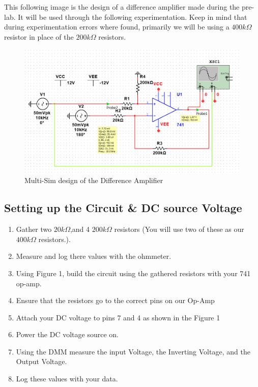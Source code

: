 \documentclass[12pt]{article}
\begin{document}
This following image is the design of a difference amplifier made during the pre-lab. It will be used through the following experimentation. Keep in mind that during experimentation errors where found, primarily we will be using a $400k\Omega$ resistor in place of the $200k\Omega$ resistors.
\begin{figure}[h]
	\label{amp}
	\caption{Multi-Sim design of the Difference Amplifier}
	\centering
	\includegraphics[width=1\textwidth]{amp}
\end{figure}



\newpage
\subsection{Setting up the Circuit \& DC source Voltage}
\begin{enumerate}
	\item Gather two $20k\Omega$,and 4 $200k\Omega$ resistors (You will use two of these as our $400k\Omega$ resistors.).
	\item Measure and log there values with the ohmmeter.
	\item Using Figure 1, build the circuit using the gathered resistors with your 741 op-amp.
	\item Ensure that the resistors go to the correct pins on our Op-Amp
	\item Attach your DC voltage to pins 7 and 4 as shown in the Figure 1
	\item Power the DC voltage source on.
	\item Using the DMM measure the input Voltage, the Inverting Voltage, and the Output Voltage.
	\item Log these values with your data.
\end{enumerate}
\end{document}
